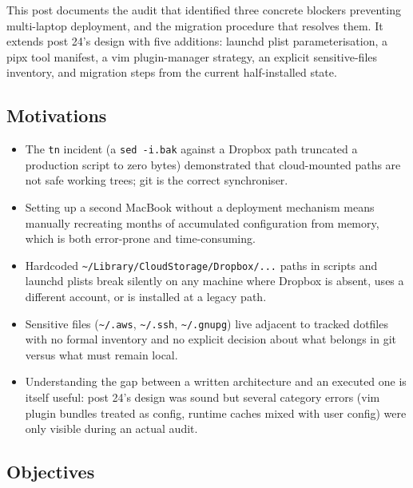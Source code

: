 \documentclass[
  11pt,
  letterpaper,
  DIV=11,
  numbers=noendperiod]{scrartcl}
\providecommand{\tightlist}{%
  \setlength{\itemsep}{0pt}\setlength{\parskip}{0pt}}
\begin{document}
This post documents the audit that identified three concrete blockers
preventing multi-laptop deployment, and the migration procedure that
resolves them. It extends post 24's design with five additions: launchd
plist parameterisation, a pipx tool manifest, a vim plugin-manager
strategy, an explicit sensitive-files inventory, and migration steps
from the current half-installed state.

\subsection{Motivations}\label{motivations}

\begin{itemize}
\tightlist
\item
  The \texttt{tn} incident (a \texttt{sed\ -i.bak} against a Dropbox
  path truncated a production script to zero bytes) demonstrated that
  cloud-mounted paths are not safe working trees; git is the correct
  synchroniser.
\item
  Setting up a second MacBook without a deployment mechanism means
  manually recreating months of accumulated configuration from memory,
  which is both error-prone and time-consuming.
\item
  Hardcoded \texttt{\textasciitilde{}/Library/CloudStorage/Dropbox/...}
  paths in scripts and launchd plists break silently on any machine
  where Dropbox is absent, uses a different account, or is installed at
  a legacy path.
\item
  Sensitive files (\texttt{\textasciitilde{}/.aws},
  \texttt{\textasciitilde{}/.ssh}, \texttt{\textasciitilde{}/.gnupg})
  live adjacent to tracked dotfiles with no formal inventory and no
  explicit decision about what belongs in git versus what must remain
  local.
\item
  Understanding the gap between a written architecture and an executed
  one is itself useful: post 24's design was sound but several category
  errors (vim plugin bundles treated as config, runtime caches mixed
  with user config) were only visible during an actual audit.
\end{itemize}

\subsection{Objectives}\label{objectives}
\end{document}
